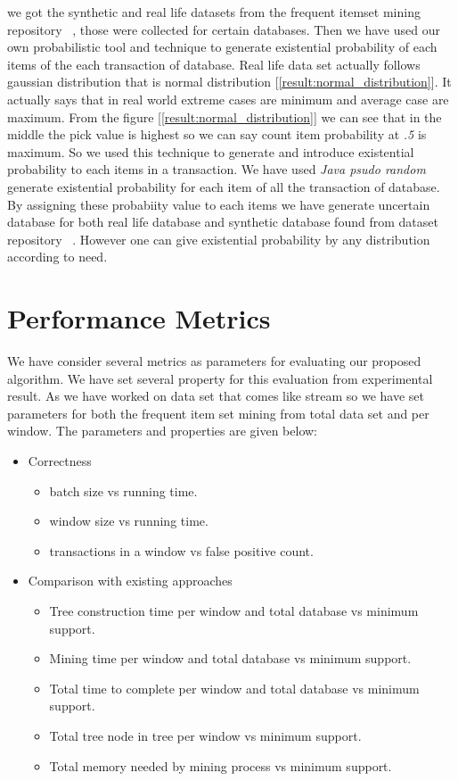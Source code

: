 
we got the synthetic and real life datasets from the frequent itemset mining repository ~\cite{dataset}, those were collected for certain databases. Then we have used our own probabilistic tool and technique to generate existential probability of each items of the each transaction of database. Real life data set actually follows gaussian distribution that is normal distribution [\ref{result:normal_distribution}]. It actually says that in real world extreme cases are minimum and average case are maximum. From the figure [\ref{result:normal_distribution}] we can see that in the middle the pick value is highest so we can say count item probability at \emph{.5} is maximum. So we used this technique to generate and introduce existential probability to each items in a transaction. We have used \emph{Java psudo random} generate existential probability for each item of all the transaction of database. By assigning these probabiity value to each items we have generate uncertain database for both real life database and synthetic database found from dataset repository ~\cite{dataset}. However one can give existential probability by any distribution according to need.


\section{Performance Metrics}
We have consider several metrics as parameters for evaluating our proposed algorithm. We have set several property for this evaluation from experimental result. As we have worked on data set that comes like stream so we have set parameters for both the frequent item set mining from total data set and per window. The parameters and properties are given below:

\begin{itemize}
	\item {Correctness}
	\begin{itemize}
		\item batch size vs running time.
		\item window size vs running time.
		\item transactions in a window vs false positive count.
	\end{itemize}
	\item {Comparison with existing approaches}
	\begin{itemize}
		\item Tree construction time per window and total database vs minimum support.
		\item Mining time per window and total database vs minimum support.
		\item Total time to complete per window and total database vs minimum support.
		\item Total tree node in tree per window vs minimum support.
		\item Total memory needed by mining process vs minimum support.
	\end{itemize}
\end{itemize}
